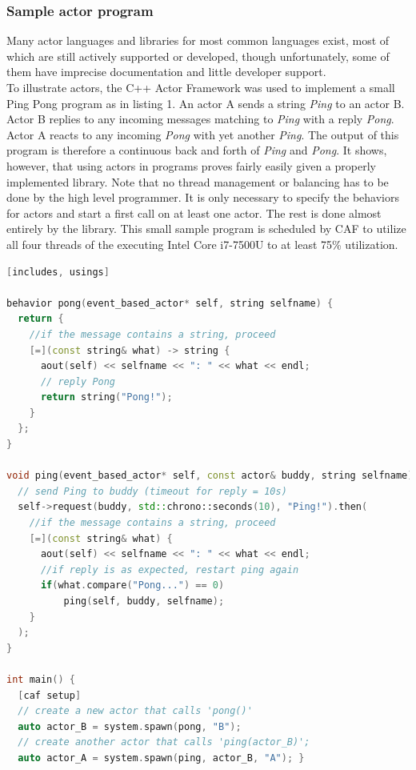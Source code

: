 \documentclass[A4]{article}
\begin{document}
\begin{draft}
\subsubsection{Sample actor program}
Many actor languages and libraries for most common languages exist, most of which are still actively supported or developed, though unfortunately, some of them have imprecise documentation and little developer support.\cite{WikiLang} \\
To illustrate actors, the C++ Actor Framework \cite{cshw-nassp-13}\cite{chs-rapc-16} was used to implement a small Ping Pong program as in listing 1. An actor A sends a string {\it Ping} to an actor B. Actor B replies to any incoming messages matching to {\it Ping} with a reply {\it Pong}. Actor A reacts to any incoming {\it Pong} with yet another {\it Ping}.
The output of this program is therefore a continuous back and forth of {\it Ping} and {\it Pong}. It shows, however, that using actors in programs proves fairly easily given a properly implemented library. Note that no thread management or balancing has to be done by the high level programmer. It is only necessary to specify the behaviors for actors and start a first call on at least one actor. The rest is done almost entirely by the library. This small sample program is scheduled by CAF to utilize all four threads of the executing Intel Core i7-7500U to at least 75\% utilization. 
\begin{lstlisting}[language=C++, caption=sample code, frame=single, breaklines]
[includes, usings]

behavior pong(event_based_actor* self, string selfname) {
  return {
    //if the message contains a string, proceed
    [=](const string& what) -> string {
      aout(self) << selfname << ": " << what << endl;
      // reply Pong
      return string("Pong!");
    }
  };
}

void ping(event_based_actor* self, const actor& buddy, string selfname) {
  // send Ping to buddy (timeout for reply = 10s)
  self->request(buddy, std::chrono::seconds(10), "Ping!").then(
    //if the message contains a string, proceed
    [=](const string& what) {
      aout(self) << selfname << ": " << what << endl;
	  //if reply is as expected, restart ping again
	  if(what.compare("Pong...") == 0)
		  ping(self, buddy, selfname);
    }
  );
}

int main() {
  [caf setup]
  // create a new actor that calls 'pong()'
  auto actor_B = system.spawn(pong, "B");
  // create another actor that calls 'ping(actor_B)';
  auto actor_A = system.spawn(ping, actor_B, "A"); }
\end{lstlisting}
\end{draft}
\end{document}
